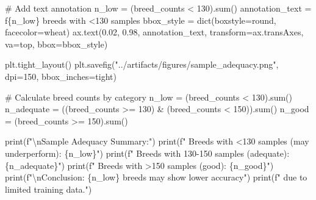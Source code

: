 \documentclass[
  letterpaper,
  DIV=11,
  numbers=noendperiod]{scrartcl}
\newenvironment{Shaded}{\begin{snugshade}}{\end{snugshade}}
\newcommand{\BuiltInTok}[1]{\textcolor[rgb]{0.00,0.23,0.31}{#1}}
\newcommand{\CharTok}[1]{\textcolor[rgb]{0.13,0.47,0.30}{#1}}
\newcommand{\CommentTok}[1]{\textcolor[rgb]{0.37,0.37,0.37}{#1}}
\newcommand{\DecValTok}[1]{\textcolor[rgb]{0.68,0.00,0.00}{#1}}
\newcommand{\FloatTok}[1]{\textcolor[rgb]{0.68,0.00,0.00}{#1}}
\newcommand{\NormalTok}[1]{\textcolor[rgb]{0.00,0.23,0.31}{#1}}
\newcommand{\OperatorTok}[1]{\textcolor[rgb]{0.37,0.37,0.37}{#1}}
\newcommand{\SpecialCharTok}[1]{\textcolor[rgb]{0.37,0.37,0.37}{#1}}
\newcommand{\SpecialStringTok}[1]{\textcolor[rgb]{0.13,0.47,0.30}{#1}}
\newcommand{\StringTok}[1]{\textcolor[rgb]{0.13,0.47,0.30}{#1}}
\renewenvironment{Shaded}{%
  \begin{tcolorbox}[%
    enhanced,%
    colback=codebg,%
    colframe=codebg,%
    borderline west={3pt}{0pt}{sectionblue},%
    boxrule=0pt,%
    arc=0pt,%
    boxsep=5pt,%
    left=2mm,%
    right=2mm,%
    top=2mm,%
    bottom=2mm%
  ]%
}{%
  \end{tcolorbox}%
}
\begin{document}
\begin{Shaded}
\begin{Highlighting}[]
\CommentTok{\# Add text annotation}
\NormalTok{n\_low }\OperatorTok{=}\NormalTok{ (breed\_counts }\OperatorTok{\textless{}} \DecValTok{130}\NormalTok{).}\BuiltInTok{sum}\NormalTok{()}
\NormalTok{annotation\_text }\OperatorTok{=} \SpecialStringTok{f\textquotesingle{}}\SpecialCharTok{\{}\NormalTok{n\_low}\SpecialCharTok{\}}\SpecialStringTok{ breeds with \textless{}130 samples\textquotesingle{}}
\NormalTok{bbox\_style }\OperatorTok{=} \BuiltInTok{dict}\NormalTok{(boxstyle}\OperatorTok{=}\StringTok{\textquotesingle{}round\textquotesingle{}}\NormalTok{, facecolor}\OperatorTok{=}\StringTok{\textquotesingle{}wheat\textquotesingle{}}\NormalTok{)}
\NormalTok{ax.text(}\FloatTok{0.02}\NormalTok{, }\FloatTok{0.98}\NormalTok{, annotation\_text, transform}\OperatorTok{=}\NormalTok{ax.transAxes, }
\NormalTok{        va}\OperatorTok{=}\StringTok{\textquotesingle{}top\textquotesingle{}}\NormalTok{, bbox}\OperatorTok{=}\NormalTok{bbox\_style)}

\NormalTok{plt.tight\_layout()}
\NormalTok{plt.savefig(}\StringTok{"../artifacts/figures/sample\_adequacy.png"}\NormalTok{, }
\NormalTok{            dpi}\OperatorTok{=}\DecValTok{150}\NormalTok{, bbox\_inches}\OperatorTok{=}\StringTok{\textquotesingle{}tight\textquotesingle{}}\NormalTok{)}

\CommentTok{\# Calculate breed counts by category}
\NormalTok{n\_low }\OperatorTok{=}\NormalTok{ (breed\_counts }\OperatorTok{\textless{}} \DecValTok{130}\NormalTok{).}\BuiltInTok{sum}\NormalTok{()}
\NormalTok{n\_adequate }\OperatorTok{=}\NormalTok{ ((breed\_counts }\OperatorTok{\textgreater{}=} \DecValTok{130}\NormalTok{) }\OperatorTok{\&} 
\NormalTok{              (breed\_counts }\OperatorTok{\textless{}} \DecValTok{150}\NormalTok{)).}\BuiltInTok{sum}\NormalTok{()}
\NormalTok{n\_good }\OperatorTok{=}\NormalTok{ (breed\_counts }\OperatorTok{\textgreater{}=} \DecValTok{150}\NormalTok{).}\BuiltInTok{sum}\NormalTok{()}

\BuiltInTok{print}\NormalTok{(}\SpecialStringTok{f"}\CharTok{\textbackslash{}n}\SpecialStringTok{Sample Adequacy Summary:"}\NormalTok{)}
\BuiltInTok{print}\NormalTok{(}\SpecialStringTok{f"  Breeds with \textless{}130 samples (may underperform): }\SpecialCharTok{\{}\NormalTok{n\_low}\SpecialCharTok{\}}\SpecialStringTok{"}\NormalTok{)}
\BuiltInTok{print}\NormalTok{(}\SpecialStringTok{f"  Breeds with 130{-}150 samples (adequate): }\SpecialCharTok{\{}\NormalTok{n\_adequate}\SpecialCharTok{\}}\SpecialStringTok{"}\NormalTok{)}
\BuiltInTok{print}\NormalTok{(}\SpecialStringTok{f"  Breeds with \textgreater{}150 samples (good): }\SpecialCharTok{\{}\NormalTok{n\_good}\SpecialCharTok{\}}\SpecialStringTok{"}\NormalTok{)}
\BuiltInTok{print}\NormalTok{(}\SpecialStringTok{f"}\CharTok{\textbackslash{}n}\SpecialStringTok{Conclusion: }\SpecialCharTok{\{}\NormalTok{n\_low}\SpecialCharTok{\}}\SpecialStringTok{ breeds may show lower accuracy"}\NormalTok{)}
\BuiltInTok{print}\NormalTok{(}\SpecialStringTok{f"  due to limited training data."}\NormalTok{)}
\end{Highlighting}
\end{Shaded}
\end{document}
